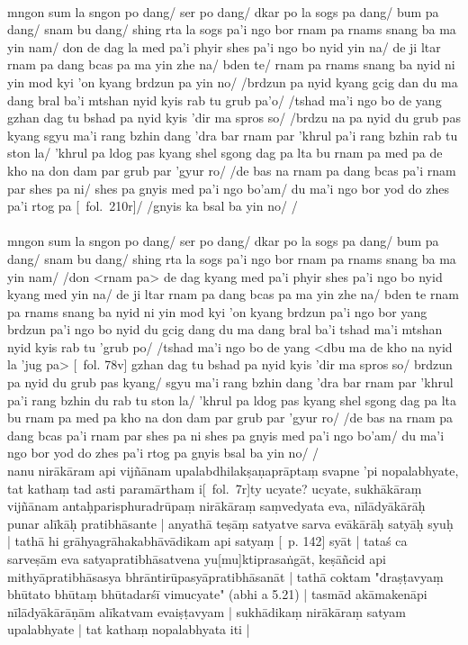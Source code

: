 \documentclass[12pt]{article}
\begin{document}
\textbf{\TVA}\\
mngon sum la sngon po dang/ ser po dang/ dkar po la sogs pa dang/ bum pa dang/ snam bu dang/ shing rta la sogs pa'i ngo bor rnam pa rnams snang ba ma yin nam/ don de dag la med pa'i phyir shes pa'i ngo bo nyid yin na/ de ji ltar rnam pa dang bcas pa ma yin zhe na/ bden te/ rnam pa rnams snang ba nyid ni yin mod kyi 'on kyang brdzun pa yin no/ /brdzun pa nyid kyang gcig dan du ma dang bral ba'i mtshan nyid kyis rab tu grub pa'o/ /tshad ma'i ngo bo de yang gzhan dag tu bshad pa nyid kyis 'dir ma spros so/ /brdzu na pa nyid du grub pas kyang sgyu ma'i rang bzhin dang 'dra bar rnam par 'khrul pa'i rang bzhin rab tu ston la/ 'khrul pa ldog pas kyang shel sgong dag pa lta bu rnam pa med pa de kho na don dam par grub par 'gyur ro/ /de bas na rnam pa dang bcas pa'i rnam par shes pa ni/ shes pa gnyis med pa'i ngo bo'am/ du ma'i ngo bor yod do zhes pa'i rtog pa [\TVA\ fol.\ 210r]/ /gnyis ka bsal ba yin no/ /\\

\textbf{\TVB}\\
mngon sum la sngon po dang/ ser po dang/ dkar po la sogs pa dang/ bum pa dang/ snam bu dang/ shing rta la sogs pa'i ngo bor rnam pa rnams snang ba ma yin nam/ /don <rnam pa> de dag kyang med pa'i phyir shes pa'i ngo bo nyid kyang med yin na/ de ji ltar rnam pa dang bcas pa ma yin zhe na/ bden te rnam pa rnams snang ba nyid ni yin mod kyi 'on kyang brdzun pa'i ngo bor yang brdzun pa'i ngo bo nyid du gcig dang du ma dang bral ba'i tshad ma'i mtshan nyid kyis rab tu 'grub po/ /tshad ma'i ngo bo de yang <dbu ma de kho na nyid la 'jug pa> [\TVB\ fol. 78v] gzhan dag tu bshad pa nyid kyis 'dir ma spros so/ brdzun pa nyid du grub pas kyang/ sgyu ma'i rang bzhin dang 'dra bar rnam par 'khrul pa'i rang bzhin du rab tu ston la/ 'khrul pa ldog pas kyang shel sgong dag pa lta bu rnam pa med pa kho na don dam par grub par 'gyur ro/ /de bas na rnam pa dang bcas pa'i rnam par shes pa ni shes pa gnyis med pa'i ngo bo'am/ du ma'i ngo bor yod do zhes pa'i rtog pa gnyis bsal ba yin no/ /\\

nanu nirākāram api vijñānam upalabdhilakṣaṇaprāptaṃ svapne 'pi nopalabhyate, tat kathaṃ tad asti paramārtham i[\MS\ fol.\ 7r]ty ucyate? ucyate, sukhākāraṃ vijñānam antaḥparisphuradrūpaṃ nirākāraṃ saṃvedyata eva, nīlādyākārāḥ punar alīkāḥ pratibhāsante | anyathā teṣāṃ satyatve sarva evākārāḥ satyāḥ syuḥ | tathā hi grāhyagrāhakabhāvādikam api satyaṃ [\EDD\ p. 142] syāt | tataś ca sarveṣām eva satyapratibhāsatvena yu[mu]ktiprasaṅgāt, keṣāñcid api mithyāpratibhāsasya bhrāntirūpasyāpratibhāsanāt | tathā coktam "draṣṭavyaṃ bhūtato bhūtaṃ bhūtadarśī vimucyate" (abhi a 5.21) | tasmād akāmakenāpi nīlādyākārāṇām alīkatvam evaiṣṭavyam | sukhādikaṃ nirākāraṃ satyam upalabhyate | tat kathaṃ nopalabhyata iti |\\
\end{document}
